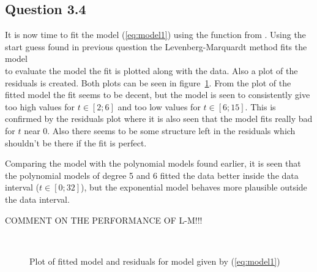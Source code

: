 \subsection*{Question 3.4}
It is now time to fit the model (\ref{eq:model1}) using the  function from . Using the start guess found in previous question the Levenberg-Marquardt method fits the model
\begin{equation*}
    
\end{equation*}
to evaluate the model the fit is plotted along with the data. Also a plot of the residuals is created. Both plots can be seen in figure~\ref{fig:model1-plots}. From the plot of the fitted model the fit seems to be decent, but the model is seen to consistently give too high values for $t\in[2;6]$ and too low values for $t\in[6; 15]$. This is confirmed by the residuals plot where it is also seen that the model fits really bad for $t$ near 0. Also there seems to be some structure left in the residuals which shouldn't be there if the fit is perfect. \par
Comparing the model with the polynomial models found earlier, it is seen that the polynomial models of degree 5 and 6 fitted the data better inside the data interval ($t\in[0; 32]$), but the exponential model behaves more plausible outside the data interval.\par
COMMENT ON THE PERFORMANCE OF L-M!!!

\begin{figure}
    \centering
    \mbox{ \quad {}}
    \caption{Plot of fitted model and residuals for model given by (\ref{eq:model1})}
    \label{fig:model1-plots}
\end{figure}

